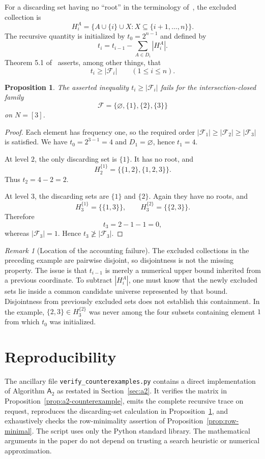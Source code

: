 \documentclass[11pt]{amsart}
\newtheorem{proposition}[theorem]{Proposition}
\theoremstyle{definition}
\theoremstyle{remark}
\newtheorem{remark}[theorem]{Remark}
\newcommand{\F}{\mathcal F}
\newcommand{\Aalg}{\mathsf A_2}
\begin{document}
For a discarding set having no ``root'' in the terminology of~\cite{Schrader2025}, the excluded collection is
\[
  H_i^A=\bigl\{A\cup\{i\}\cup X:X\subseteq\{i+1,\ldots,n\}\bigr\}.
\]
The recursive quantity is initialized by $t_0=2^{n-1}$ and defined by
\[
  t_i=t_{i-1}-\sum_{A\in D_i}|H_i^A|.
\]
Theorem 5.1 of~\cite{Schrader2025} asserts, among other things, that
\[
  t_i\ge |\F_i| \qquad (1\le i\le n).
\]

\begin{proposition}\label{prop:schrader-counterexample}
The asserted inequality $t_i\ge|\F_i|$ fails for the intersection-closed family
\[
  \F=\{\varnothing,\{1\},\{2\},\{3\}\}
\]
on $N=[3]$.
\end{proposition}

\begin{proof}
Each element has frequency one, so the required order $|\F_1|\ge|\F_2|\ge|\F_3|$ is satisfied. We have $t_0=2^{3-1}=4$ and $D_1=\varnothing$, hence $t_1=4$.

At level $2$, the only discarding set is $\{1\}$. It has no root, and
\[
  H_2^{\{1\}}=\{\{1,2\},\{1,2,3\}\}.
\]
Thus $t_2=4-2=2$.

At level $3$, the discarding sets are $\{1\}$ and $\{2\}$. Again they have no roots, and
\[
  H_3^{\{1\}}=\{\{1,3\}\},
  \qquad
  H_3^{\{2\}}=\{\{2,3\}\}.
\]
Therefore
\[
  t_3=2-1-1=0,
\]
whereas $|\F_3|=1$. Hence $t_3\not\ge|\F_3|$.
\end{proof}

\begin{remark}[Location of the accounting failure]
The excluded collections in the preceding example are pairwise disjoint, so disjointness is not the missing property. The issue is that $t_{i-1}$ is merely a numerical upper bound inherited from a previous coordinate. To subtract $|H_i^A|$, one must know that the newly excluded sets lie inside a common candidate universe represented by that bound. Disjointness from previously excluded sets does not establish this containment. In the example, $\{2,3\}\in H_3^{\{2\}}$ was never among the four subsets containing element $1$ from which $t_0$ was initialized.
\end{remark}

\section{Reproducibility}\label{sec:reproducibility}

The ancillary file \texttt{verify\_counterexamples.py} contains a direct implementation of Algorithm $\Aalg$ as restated in Section~\ref{sec:a2}. It verifies the matrix in Proposition~\ref{prop:a2-counterexample}, emits the complete recursive trace on request, reproduces the discarding-set calculation in Proposition~\ref{prop:schrader-counterexample}, and exhaustively checks the row-minimality assertion of Proposition~\ref{prop:row-minimal}. The script uses only the Python standard library. The mathematical arguments in the paper do not depend on trusting a search heuristic or numerical approximation.
\end{document}
